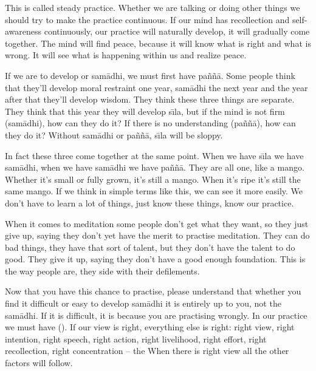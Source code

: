 This is called steady practice. Whether we are talking or doing other things we should try to make the practice continuous. If our mind has recollection and self-awareness continuously, our practice will naturally develop, it will gradually come together. The mind will find peace, because it will know what is right and what is wrong. It will see what is happening within us and realize peace. 

If we are to develop  or sam\=adhi, we must first have pa\~n\~n\=a. Some people think that they'll develop moral restraint one year, sam\=adhi the next year and the year after that they'll develop wisdom. They think these three things are separate. They think that this year they will develop s\={\i}la, but if the mind is not firm (sam\=adhi), how can they do it? If there is no understanding (pa\~n\~n\=a), how can they do it? Without sam\=adhi or pa\~n\~n\=a, s\={\i}la will be sloppy. 

In fact these three come together at the same point. When we have s\={\i}la we have sam\=adhi, when we have sam\=adhi we have pa\~n\~n\=a. They are all one, like a mango. Whether it's small or fully grown, it's still a mango. When it's ripe it's still the same mango. If we think in simple terms like this, we can see it more easily. We don't have to learn a lot of things, just know these things, know our practice. 

When it comes to meditation some people don't get what they want, so they just give up, saying they don't yet have the merit to practise meditation. They can do bad things, they have that sort of talent, but they don't have the talent to do good. They give it up, saying they don't have a good enough foundation. This is the way people are, they side with their defilements. 

Now that you have this chance to practise, please understand that whether you find it difficult or easy to develop sam\=adhi it is entirely up to you, not the sam\=adhi. If it is difficult, it is because you are practising wrongly. In our practice we must have  (). If our view is right, everything else is right: right view, right intention, right speech, right action, right livelihood, right effort, right recollection, right concentration -- the  When there is right view all the other factors will follow. 

